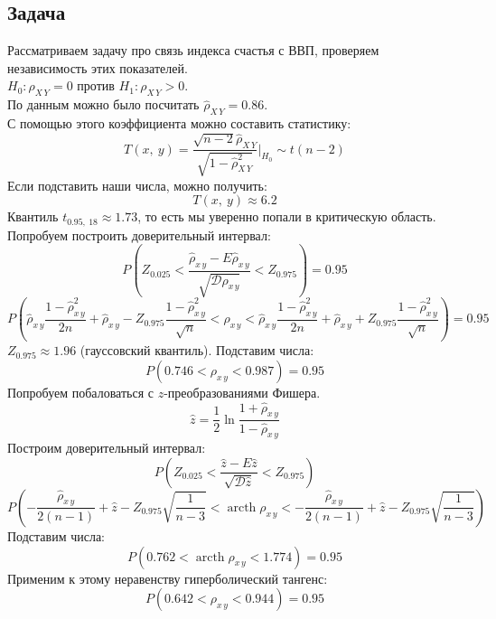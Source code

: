 \documentclass[12pt, a4paper]{article}
\newcommand{\dev}{\mathcal{D}}
\begin{document}
\subsection*{Задача}
Рассматриваем задачу про связь индекса счастья с ВВП, проверяем независимость этих показателей.\\
$H_0: \rho_{X\, Y} = 0$ против $H_1: \rho_{X\, Y} > 0$.\\
По данным можно было посчитать $\hat \rho_{X\, Y} = 0.86$.\\
С помощью этого коэффициента можно составить статистику:
\[
T(x,\ y) = \frac{\sqrt{n - 2} \hat\rho_{X\, Y}}{\sqrt{1 - \hat \rho_{X\, Y}^2}} \Big|_{H_0} \sim t(n - 2)
\]
Если подставить наши числа, можно получить:
\[
T(x,\ y) \approx 6.2
\]
Квантиль $t_{0.95,\ 18} \approx 1.73$, то есть мы уверенно попали в критическую область.\\
Попробуем построить доверительный интервал:
\[P\left( Z_{0.025} < \frac{\hat \rho_{x\, y} - E\hat \rho_{x\, y}}{\sqrt{\dev \hat \rho_{x\, y}}} < Z_{0.975} \right) = 0.95\]
\[P\left( \hat \rho_{x\, y} \frac{1 - \hat\rho^2_{x\, y}}{2n} + \hat \rho_{x\, y} - Z_{0.975} \frac{1 - \hat\rho_{x\, y}^2}{\sqrt{n}} < \rho_{x\, y} < \hat\rho_{x\, y} \frac{1 - \hat\rho^2_{x\, y}}{2n} + \hat \rho_{x\, y} + Z_{0.975} \frac{1 - \hat\rho_{x\, y}^2}{\sqrt{n}} \right) = 0.95\]
$Z_{0.975} \approx 1.96$ (гауссовский квантиль). Подставим числа:
\[P\left( 0.746 < \rho_{x\, y} < 0.987 \right) = 0.95\]
Попробуем побаловаться с $z$-преобразованиями Фишера.
\[
\hat z = \frac{1}{2} \ln \frac{1 + \hat \rho_{x\, y}}{1 - \hat \rho_{x\, y}}
\]
Построим доверительный интервал:
\[
P\left( Z_{0.025} < \frac{\hat z - E\hat z}{\sqrt{\dev \hat z}} < Z_{0.975} \right)
\]
\[
P\left( -\frac{\hat \rho_{x\, y}}{2(n - 1)} + \hat z - Z_{0.975} \sqrt{\frac{1}{n - 3}} < \operatorname{arcth} \rho_{x\, y} < -\frac{\hat \rho_{x\, y}}{2(n - 1)} + \hat z - Z_{0.975} \sqrt{\frac{1}{n - 3}}\right)
\]
Подставим числа:
\[
P\left( 0.762 < \operatorname{arcth} \rho_{x\, y} < 1.774 \right) = 0.95
\]
Применим к этому неравенству гиперболический тангенс:
\[
P\left( 0.642 < \rho_{x\, y} < 0.944 \right) = 0.95
\]
\end{document}
